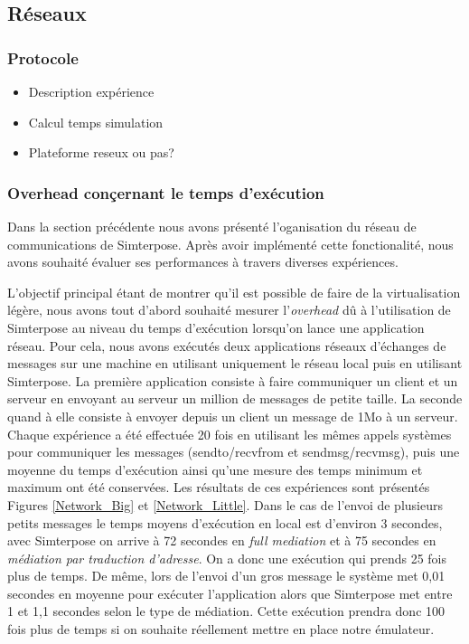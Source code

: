 \subsection{Réseaux}
\label{subsection:res}
\subsubsection{Protocole}
\begin{itemize}
  \item Description expérience
  \item Calcul temps simulation
  \item Plateforme reseux ou pas?
\end{itemize}

\subsubsection{Overhead conçernant le temps d'exécution}
Dans la section précédente nous avons présenté l'oganisation du réseau de communications de Simterpose. Après avoir implémenté cette fonctionalité, nous avons souhaité évaluer ses performances à travers diverses expériences.

L'objectif principal étant de montrer qu'il est possible de faire de la virtualisation légère, nous avons tout d'abord souhaité mesurer l'\textit{overhead} dû à l'utilisation de Simterpose au niveau du temps d'exécution lorsqu'on lance une application réseau. Pour cela, nous avons exécutés deux applications réseaux d'échanges de messages sur une machine en utilisant uniquement le réseau local puis en utilisant Simterpose. La première application consiste à faire communiquer un client et un serveur en envoyant au serveur un million de messages de petite taille. La seconde quand à elle consiste à envoyer depuis un client un message de 1Mo à un serveur. Chaque expérience a été effectuée 20 fois en utilisant les mêmes appels systèmes pour communiquer les messages ({\color{red}sendto/recvfrom et sendmsg/recvmsg}), puis une moyenne du temps d'exécution ainsi qu'une mesure des temps minimum et maximum ont été conservées. Les résultats de ces expériences sont présentés Figures \ref{Network_Big} et \ref{Network_Little}. Dans le cas de l'envoi de plusieurs petits messages le temps moyens d'exécution en local est d'environ 3 secondes, avec Simterpose on arrive à 72 secondes en \textit{full mediation} et à 75 secondes en \textit{médiation par traduction d'adresse}. On a donc une exécution qui prends 25 fois plus de temps. De même, lors de l'envoi d'un gros message le système met 0,01 secondes en moyenne pour exécuter l'application alors que Simterpose met entre 1 et 1,1 secondes selon le type de médiation. Cette exécution prendra donc 100 fois plus de temps si on souhaite réellement mettre en place notre émulateur.

